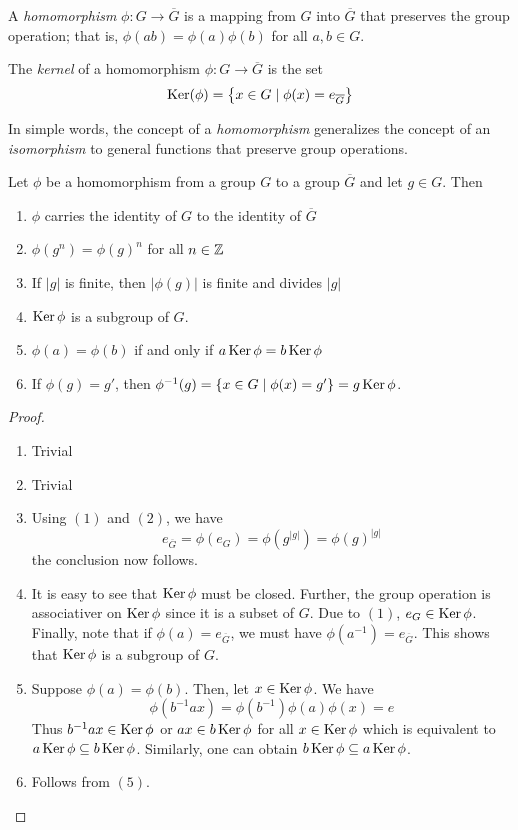 \begin{definition}[Homomorphism]
	A \textit{homomorphism} $\phi:G\to\overline{G}$ is a mapping from $G$ into $\overline{G}$ that preserves the group operation; that is, $\phi(ab)=\phi(a)\phi(b)$ for all $a,b\in G$.
\end{definition}

\begin{definition}[Kernel]
	The \textit{kernel} of a homomorphism $\phi:G\to\overline{G}$ is the set 
	$$\operatorname{Ker}(\phi)=\left\{x\in G\mid \phi(x)=e_{\overline{G}}\right\}$$
\end{definition}

In simple words, the concept of a \textit{homomorphism} generalizes the concept of an \textit{isomorphism} to general functions that preserve group operations.

\begin{proposition}
	Let $\phi$ be a homomorphism from a group $G$ to a group $\overline{G}$ and let $g\in G$. Then
	\begin{enumerate}
		\item $\phi$ carries the identity of $G$ to the identity of $\overline{G}$
		\item $\phi(g^n)=\phi(g)^n$ for all $n\in\mathbb{Z}$
		\item If $|g|$ is finite, then $|\phi(g)|$ is finite and divides $|g|$
		\item $\operatorname{Ker}\phi$ is a subgroup of $G$.
		\item $\phi(a)=\phi(b)$ if and only if $a\operatorname{Ker}\phi=b\operatorname{Ker}\phi$
		\item If $\phi(g)=g'$, then $\phi^{-1}(g)=\left\{x\in G\mid\phi(x)=g'\right\}=g\operatorname{Ker}\phi$.
	\end{enumerate}
\end{proposition}
\begin{proof}\hfill
	\begin{enumerate}
		\item Trivial
		\item Trivial
		\item Using $(1)$ and $(2)$, we have 
		$$
		e_{\overline{G}} = \phi(e_{G}) = \phi(g^{|g|}) = \phi(g)^{|g|}
		$$
		the conclusion now follows.
		\item It is easy to see that $\operatorname{Ker}\phi$ must be closed. Further, the group operation is associativer on $\operatorname{Ker}\phi$ since it is a subset of $G$. Due to $(1)$, $e_G\in\operatorname{Ker}\phi$. Finally, note that if $\phi(a)=e_{\overline{G}}$, we must have $\phi(a^{-1})=e_{\overline{G}}$. This shows that $\operatorname{Ker}\phi$ is a subgroup of $G$.
		\item Suppose $\phi(a)=\phi(b)$. Then, let $x\in\operatorname{Ker}\phi$. We have
		$$
		\phi(b^{-1}ax) = \phi(b^{-1})\phi(a)\phi(x) = e
		$$
		Thus $b^{-1}ax\in\operatorname{Ker}\phi$ or $ax\in b\operatorname{Ker}\phi$ for all $x\in\operatorname{Ker}\phi$ which is equivalent to $a\operatorname{Ker}\phi\subseteq b\operatorname{Ker}\phi$. Similarly, one can obtain $b\operatorname{Ker}\phi\subseteq a\operatorname{Ker}\phi$.
		\item Follows from $(5)$.
	\end{enumerate}
\end{proof}

